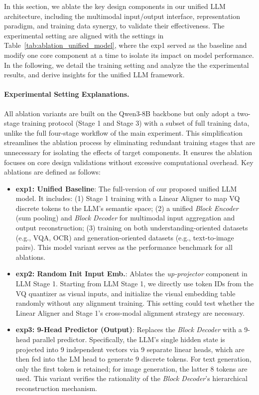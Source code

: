 \documentclass[11pt, a4paper, logo, copyright]{googledeepmind}
\begin{document}
In this section, we ablate the key design components in our unified LLM architecture, including the multimodal input/output interface, representation paradigm, and training data synergy, to validate their effectiveness. The experimental setting are aligned with the settings in Table~\ref{tab:ablation_unified_model}, where the exp1 served as the baseline and modify one core component at a time to isolate its impact on model performance. In the following, we detail the training setting and analyze the the experimental results, and derive insights for the unified LLM framework.

\paragraph{Experimental Setting Explanations.}


All ablation variants are built on the Qwen3-8B backbone but only adopt a two-stage training protocol (Stage 1 and Stage 3) with a subset of full training data, unlike the full four-stage workflow of the main experiment. This simplification streamlines the ablation process by eliminating redundant training stages that are unnecessary for isolating the effects of target components. It ensures the ablation focuses on core design validations without excessive computational overhead. Key ablations are defined as follows:
\begin{itemize}

\item \textbf{exp1: Unified Baseline}: The full-version of our proposed unified LLM model. It includes: (1) Stage 1 training with a Linear Aligner to map VQ discrete tokens to the LLM's semantic space; (2) a unified \textit{Block Encoder} (sum pooling) and \textit{Block Decoder} for multimodal input aggregation and output reconstruction; (3) training on both understanding-oriented datasets (e.g., VQA, OCR) and generation-oriented datasets (e.g., text-to-image pairs). This model variant serves as the performance benchmark for all ablations.

\item \textbf{exp2: Random Init Input Emb.}: Ablates the \textit{up-projector} component in LLM Stage 1. Starting from LLM Stage 1, we directly use token IDs from the VQ quantizer as visual inputs, and initialize the visual embedding table randomly without any alignment training. This setting could test whether the Linear Aligner and Stage 1's cross-modal alignment strategy are necessary.

\item \textbf{exp3: 9-Head Predictor (Output)}: Replaces the \textit{Block Decoder} with a 9-head parallel predictor. Specifically, the LLM's single hidden state is projected into 9 independent vectors via 9 separate linear heads, which are then fed into the LM head to generate 9 discrete tokens. For text generation, only the first token is retained; for image generation, the latter 8 tokens are used. This variant verifies the rationality of the \textit{Block Decoder}'s hierarchical reconstruction mechanism.

\end{itemize}
\end{document}
